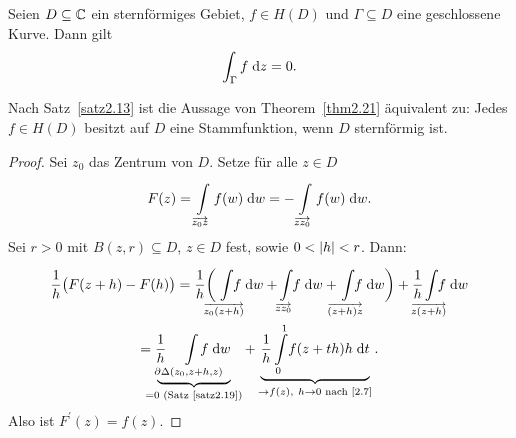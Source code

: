 \documentclass[a4paper,twoside,DIV15,BCOR12mm]{scrbook}
\begin{document}
\begin{center}
\end{center}

\begin{thm} \label{thm2.21}
  Seien $D\subseteq\mathbb{C}$ ein sternförmiges Gebiet, $f\in H(D)$ und $\Gamma\subseteq D$ eine geschlossene Kurve. Dann gilt
  \[\int_{\Gamma}^{}{f}\;\mathrm{d} z = 0.\]
\end{thm}
\begin{bem*}
  Nach Satz~\ref{satz2.13} ist die Aussage von Theorem~\ref{thm2.21} äquivalent zu: Jedes $f\in H(D)$ besitzt auf $D$ eine
  Stammfunktion, wenn $D$ sternförmig ist.
\end{bem*}
\begin{proof}
  Sei $z_0$ das Zentrum von $D$. Setze für alle $z\in D$
  \[F(z) = \int\limits_{\overrightarrow{z_0z}}^{}{f(w)}\;\mathrm{d}w = -\int\limits_{\overrightarrow{zz_0}}^{}{f(w)}\;\mathrm{d}w.\]
  Sei $r>0$ mit $B(z,r)\subseteq D$, $z\in D$ fest, sowie $0<\left\lvert h\right\lvert<r$. Dann:
  \begin{multline*}
    \frac1h \bigl(F(z+h)-F(h)\bigr) = \frac1h \biggl(\!\!\!\!\Integral{\overrightarrow{z_0(z+h)}}{}{\!\!\!\!\!\!\!f}{w} + \!
      \Integral{\overrightarrow{zz_0}}{}{\!\!f}{w} + \!\!\!\!\Integral{\overrightarrow{(z+h)z}}{}{\!\!\!\!\!\!f}{w} \biggr) + \frac1h
      \!\!\!\!\!\Integral{\overrightarrow{z(z+h)}}{}{\!\!\!\!\!\!f}{w}  \\
    = \frac1h \!\!\!\!\!\!\!\!\!\!\underbrace{\Integral{\partial\Delta(z_0,z+h,z)}{}{\!\!\!\!\!\!\!\!\!\!\!\!f}{w}}_{=0 \text{
        (Satz~\ref{satz2.19})}} + \underbrace{\frac1h \Integral{0}{1}{\!f(z+th)h}{t}}_{\to f(z),\ h\to0 \text { nach \eqref{2.7}}}.
  \end{multline*}
  Also ist $F^\prime(z)=f(z)$.
\end{proof}
\end{document}
